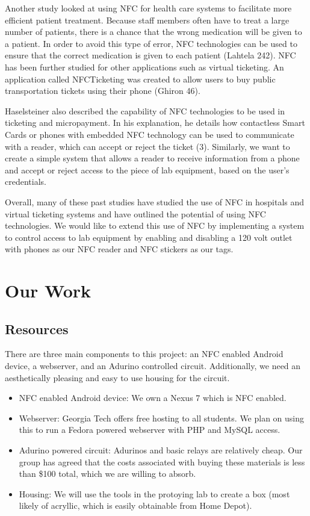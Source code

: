 \documentclass{sigchi}
\begin{document}
Another study looked at using NFC for health care systems to facilitate more efficient patient treatment. Because staff members often have to treat a large number of patients, there is a chance that the wrong medication will be given to a patient. In order to avoid this type of error, NFC technologies can be used to ensure that the correct medication is given to each patient (Lahtela 242). NFC has been further studied for other applications such as virtual ticketing. An application called NFCTicketing was created to allow users to buy public transportation tickets using their phone (Ghiron 46). 

Haselsteiner also described the capability of NFC technologies to be used in ticketing and micropayment. In his explanation, he details how contactless Smart Cards or phones with embedded NFC technology can be used to communicate with a reader, which can accept or reject the ticket (3). Similarly, we want to create a simple system that allows a reader to receive information from a phone and accept or reject access to the piece of lab equipment, based on the user’s credentials. 

Overall, many of these past studies have studied the use of NFC in hospitals and virtual ticketing systems and have outlined the potential of using NFC technologies. We would like to extend this use of NFC by implementing a system to control access to lab equipment by enabling and disabling a 120 volt outlet with phones as our NFC reader and NFC stickers as our tags.

\section{Our Work}

\subsection {Resources}
There are three main components to this project: an NFC enabled Android device, a webserver, and an Adurino controlled circuit. Additionally, we need an aesthetically pleasing and easy to use housing for the circuit.
\begin{itemize}
\item NFC enabled Android device: We own a Nexus 7 which is NFC enabled.
\item Webserver: Georgia Tech offers free hosting to all students. We plan on using this to run a Fedora powered webserver with PHP and MySQL access.
\item Adurino powered circuit: Adurinos and basic relays are relatively cheap. Our group has agreed that the costs associated with buying these materials is less than \$100 total, which we are willing to absorb.
\item Housing: We will use the tools in the protoying lab to create a box (most likely of acryllic, which is easily obtainable from Home Depot).
\end{itemize}
\end{document}
